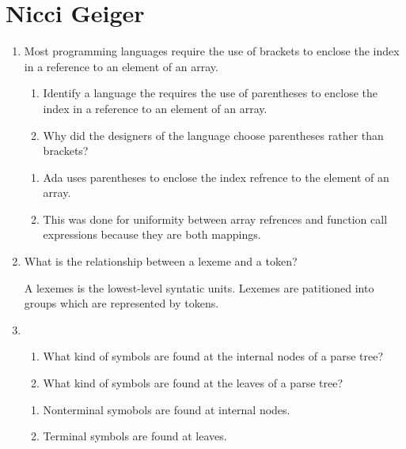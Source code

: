 
\chapter{Nicci Geiger}

\begin{enumerate}
  \item Most programming languages require the use of brackets to
    enclose the index in a reference to an element of an array.
  \begin{enumerate}
    \item Identify a language the requires the use of parentheses
      to enclose the index in a reference to an element of an array.
    \item Why did the designers of the language choose parentheses
      rather than brackets?
    \end{enumerate}

  \begin{answer}

  \begin{enumerate}
    \item Ada uses parentheses to enclose the index refrence to the element of an array.
    \item This was done for uniformity between array refrences and function call expressions because they are both mappings.
    \end{enumerate}

    \end{answer}
    
  \item What is the relationship between a lexeme and a token?

  \begin{answer}

    A lexemes is the lowest-level syntatic units.  Lexemes are patitioned into groups which are represented by tokens.
    \end{answer}

  \item
  \begin{enumerate}
    \item What kind of symbols are found at the internal nodes of a
      parse tree?
    \item What kind of symbols are found at the leaves of a parse tree?
    \end{enumerate}

  \begin{answer}

  \begin{enumerate}
    \item Nonterminal symobols are found at internal nodes.
    \item Terminal symbols  are found at leaves.
    \end{enumerate}


\end{answer}
\end{enumerate}
